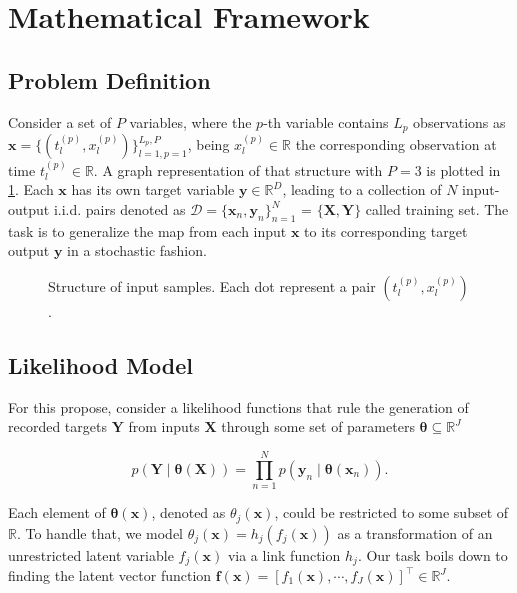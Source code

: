 \section{Mathematical Framework}

\subsection{Problem Definition}

Consider a set of \(P\) variables, where the \(p\)-th variable contains \(L_p\) observations as \(\boldsymbol{x} = \{(t_l^{(p)}, x_l^{(p)})\}_{l=1, p=1}^{L_p, P} \), being \(x_l^{(p)} \in \mathbb{R}\) the corresponding observation at time \(t_l^{(p)} \in \mathbb{R}\). A graph representation of that structure with \(P=3\) is plotted in \cref{fig:input_sample_structure}. Each \(\boldsymbol{x}\) has its own target variable \(\boldsymbol{y} \in \mathbb{R}^D \), leading to a collection of \(N\) input-output i.i.d. pairs denoted as \(\mathcal{D} = \{\boldsymbol{x}_n, \boldsymbol{y}_n\}_{n=1}^N\) = \(\{\boldsymbol{X}, \boldsymbol{Y}\}\) called training set. The task is to generalize the map from each input \(\boldsymbol{x}\) to its corresponding target output \(\boldsymbol{y}\) in a stochastic fashion.




\begin{figure}[ht]
	\centering
	
	\caption{Structure of input samples. Each dot represent a pair \((t_l^{(p)}, x_l^{(p)})\).}
	\label{fig:input_sample_structure}
\end{figure}

\subsection{Likelihood Model}

For this propose, consider a likelihood functions that rule the generation of recorded targets \(\boldsymbol{Y}\) from inputs \(\boldsymbol{X}\) through some set of parameters \(\boldsymbol{\theta} \subseteq \mathbb{R}^J\) 

\begin{equation}\label{eq:likelihood_funciton}
	p\left(\boldsymbol{Y} \mid \boldsymbol{\theta}(\boldsymbol{X})\right) = \prod_{n=1}^N p\left(\boldsymbol{y}_n \mid \boldsymbol{\theta}(\boldsymbol{x}_n)\right). 
\end{equation}

Each element of \( \boldsymbol{\theta}(\boldsymbol{x}) \), denoted as \( \theta_{j}(\boldsymbol{x}) \), could be restricted to some subset of \( \mathbb{R} \). To handle that, we model \( \theta_{j}(\boldsymbol{x}) = h_{j}(f_{j}(\boldsymbol{x})) \) as a transformation of an unrestricted latent variable \( f_{j}(\boldsymbol{x}) \) via a link function \( h_{j} \). Our task boils down to finding the latent vector function \(\boldsymbol{f}(\boldsymbol{x}) = [f_1(\boldsymbol{x}), \cdots, f_J(\boldsymbol{x})]^\top \in \mathbb{R}^J\).